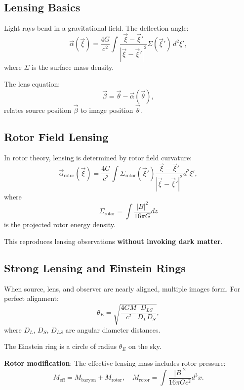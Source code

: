 \documentclass[12pt,a4paper]{article}
\theoremstyle{definition}
\theoremstyle{remark}
\begin{document}
\subsection{Lensing Basics}

Light rays bend in a gravitational field. The deflection angle:
\begin{equation}
\vec{\alpha}(\vec{\xi}) = \frac{4G}{c^2} \int \frac{\vec{\xi} - \vec{\xi}'}{|\vec{\xi} - \vec{\xi}'|^2} \Sigma(\vec{\xi}') \, d^2\xi',
\end{equation}
where $\Sigma$ is the surface mass density.

The lens equation:
\begin{equation}
\vec{\beta} = \vec{\theta} - \vec{\alpha}(\vec{\theta}),
\end{equation}
relates source position $\vec{\beta}$ to image position $\vec{\theta}$.

\subsection{Rotor Field Lensing}

In rotor theory, lensing is determined by rotor field curvature:
\begin{equation}
\vec{\alpha}_{\text{rotor}}(\vec{\xi}) = \frac{4G}{c^2} \int \Sigma_{\text{rotor}}(\vec{\xi}') \frac{\vec{\xi} - \vec{\xi}'}{|\vec{\xi} - \vec{\xi}'|^2} d^2\xi',
\end{equation}
where
\begin{equation}
\Sigma_{\text{rotor}} = \int \frac{|B|^2}{16\pi G} dz
\end{equation}
is the projected rotor energy density.

This reproduces lensing observations \textbf{without invoking dark matter}.

\subsection{Strong Lensing and Einstein Rings}

When source, lens, and observer are nearly aligned, multiple images form. For perfect alignment:
\begin{equation}
\theta_E = \sqrt{\frac{4GM}{c^2} \frac{D_{LS}}{D_L D_S}},
\end{equation}
where $D_L$, $D_S$, $D_{LS}$ are angular diameter distances.

The Einstein ring is a circle of radius $\theta_E$ on the sky.

\textbf{Rotor modification}: The effective lensing mass includes rotor pressure:
\begin{equation}
M_{\text{eff}} = M_{\text{baryon}} + M_{\text{rotor}}, \quad M_{\text{rotor}} = \int \frac{|B|^2}{16\pi G c^2} d^3x.
\end{equation}
\end{document}
